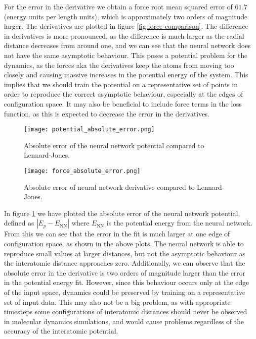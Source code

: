 For the error in the derivative we obtain a force root mean squared error
of $61.7$ (energy units per length units), which is approximately two orders
of magnitude larger. The derivatives are plotted in figure
\ref{fig:force-comparison}.
The difference in derivatives is more pronounced, as the
difference is much larger as the radial distance decreases from
around one, and we can see that the neural network does not
have the same asymptotic behaviour. This poses a potential problem
for the dynamics, as the forces aka the derivatives keep
the atoms from moving too closely and causing massive
increases in the potential energy of the system.
This implies that we should train the potential on a representative
set of points in order to reproduce the correct asymptotic behaviour,
especially at the edges of configuration space.
It may also be beneficial to include force terms in the loss function,
as this is expected to decrease the error in the derivatives.

\begin{figure}[H]
    \centering
    \texttt{[image: potential\_absolute\_error.png]}
    \caption{Absolute error of the neural network potential compared
        to Lennard-Jones.}
    \label{fig:potential-rel-error}
\end{figure}

\begin{figure}[H]
    \centering
    \texttt{[image: force\_absolute\_error.png]}
    \caption{Absolute error of neural network derivative compared
        to Lennard-Jones.}
    \label{fig:force-rel-error}
\end{figure}

In figure \ref{fig:potential-rel-error} we have plotted
the absolute error of the neural network potential, defined
as $\left| E_p - E_{\text{NN}}\right|$
where $E_{\text{NN}}$ is the potential energy from the neural network.
From this we can see that the error in the fit is much larger
at one edge of configuration space, as shown in the above plots.
The neural network is able to reproduce small values
at larger distances, but not the asymptotic behaviour
as the interatomic distance approaches zero.
Additionally, we can observe that the absolute error in the derivative
is two orders of magnitude larger than the error in the potential energy fit.
However, since
this behaviour occurs only at the edge of the input space,
dynamics could be preserved by training on a representative set
of input data. This may also not be a big problem, as
with appropriate timesteps some configurations of interatomic distances
should never be observed in molecular dynamics simulations,
and would cause problems regardless of the accuracy of the
interatomic potential.
